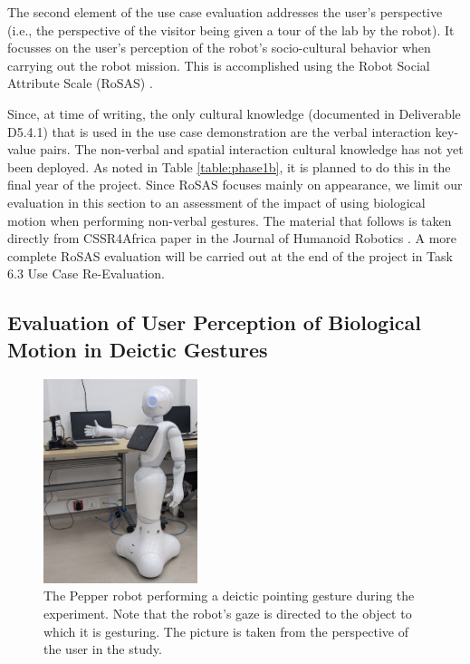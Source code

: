 \documentclass{CSSRforAfrica}
\begin{document}
The second element of the use case evaluation addresses the  user's perspective  (i.e., the perspective of the visitor being given a tour of the lab by the robot). It focusses on  the user's perception of the robot's socio-cultural behavior when carrying out the robot mission.  This is accomplished using the  Robot Social Attribute Scale (RoSAS) \cite{Carpinellaetal2017}.

Since, at time of writing, the only cultural knowledge (documented in Deliverable D5.4.1) that is used in the use case demonstration are the verbal interaction key-value pairs.  The non-verbal and spatial interaction cultural knowledge has not yet been deployed. As noted in Table \ref{table:phase1b},  it is planned to do this in the final year of the project.  Since RoSAS focuses mainly on appearance, we limit our evaluation in this section to an assessment of the impact of using biological motion when performing non-verbal gestures.  The material that follows is taken directly from CSSR4Africa paper in the Journal of Humanoid Robotics \cite{AkinadeBarrosVernon2025}.  A more complete RoSAS evaluation will be carried out at the end of the project in Task 6.3 Use Case Re-Evaluation.

\subsection{Evaluation of User Perception of Biological Motion in Deictic Gestures}


\begin{figure}
    \centering
    \includegraphics[width=0.4\textwidth]{Pepper_Gesture.jpg}
    \caption{The Pepper robot performing a deictic pointing gesture during the experiment. Note that the robot's gaze is directed to the object to which it is gesturing. The picture is taken from the perspective of the user in the study.}
    \label{fig:Pepper_Gesture}
\end{figure}
\end{document}
